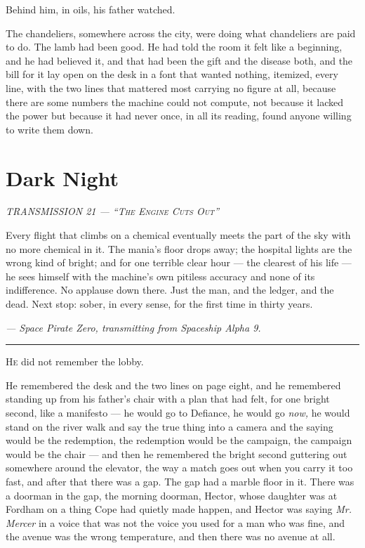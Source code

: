 \documentclass[11pt,openany]{book}
\newcommand{\transheader}{\normalfont\footnotesize\scshape\letterspace}
\newcommand{\letterspace}{}
\newenvironment{transmission}{%
  \par\vspace{0.3\baselineskip}\begin{center}\begin{minipage}{0.88\textwidth}%
  \itshape\small\setlength{\parindent}{0pt}\setstretch{1.06}}%
  {\end{minipage}\end{center}\vspace{0.4\baselineskip}%
  \noindent\hfil\rule{0.35\textwidth}{0.3pt}\hfil\par\vspace{1.0\baselineskip}}
\begin{document}
Behind him, in oils, his father watched.

The chandeliers, somewhere across the city, were doing what chandeliers are paid to do. The lamb had been good. He had told the room it felt like a beginning, and he had believed it, and that had been the gift and the disease both, and the bill for it lay open on the desk in a font that wanted nothing, itemized, every line, with the two lines that mattered most carrying no figure at all, because there are some numbers the machine could not compute, not because it lacked the power but because it had never once, in all its reading, found anyone willing to write them down.

\clearpage
\chapter{Dark Night}

\begin{transmission}
{\transheader TRANSMISSION 21 --- ``The Engine Cuts Out''}\par\vspace{0.5em}
Every flight that climbs on a chemical eventually meets the part of the sky with no more chemical in it. The mania's floor drops away; the hospital lights are the wrong kind of bright; and for one terrible clear hour --- the clearest of his life --- he sees himself with the machine's own pitiless accuracy and none of its indifference. No applause down there. Just the man, and the ledger, and the dead. Next stop: sober, in every sense, for the first time in thirty years.\par
\vspace{0.5em}\hfill\textit{--- Space Pirate Zero, transmitting from Spaceship Alpha 9.}\par
\end{transmission}


\lettrine[lines=3, lhang=0.05, nindent=0.25em]{H}{e} did not remember the lobby.

He remembered the desk and the two lines on page eight, and he remembered standing up from his father's chair with a plan that had felt, for one bright second, like a manifesto --- he would go to Defiance, he would go \textit{now,} he would stand on the river walk and say the true thing into a camera and the saying would be the redemption, the redemption would be the campaign, the campaign would be the chair --- and then he remembered the bright second guttering out somewhere around the elevator, the way a match goes out when you carry it too fast, and after that there was a gap. The gap had a marble floor in it. There was a doorman in the gap, the morning doorman, Hector, whose daughter was at Fordham on a thing Cope had quietly made happen, and Hector was saying \textit{Mr. Mercer} in a voice that was not the voice you used for a man who was fine, and the avenue was the wrong temperature, and then there was no avenue at all.
\end{document}
